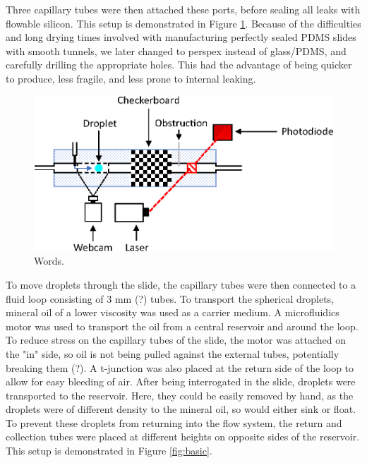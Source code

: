 \documentclass{physics_article_B}
\begin{document}
        Three capillary tubes were then attached these ports, before sealing all leaks with flowable silicon. This setup is demonstrated in Figure \ref{fig:control}. Because of the difficulties and long drying times involved with manufacturing perfectly sealed PDMS slides with smooth tunnels, we later changed to perspex instead of glass/PDMS, and carefully drilling the appropriate holes. This had the advantage of being quicker to produce, less fragile, and less prone to internal leaking. 
        
            \begin{figure}[H]
            \centering
            \hspace*{2cm}\includegraphics[scale=0.9]{Figures/Control.eps}
            \captionsetup{justification=centering}
            \caption{Words.} 	
            \label{fig:control}
            \end{figure} 
    
        To move droplets through the slide, the capillary tubes were then connected to a fluid loop consisting of 3 mm (?) tubes. To transport the spherical droplets, mineral oil of a lower viscosity was used as a carrier medium. A microfluidics motor was used to transport the oil from a central reservoir and around the loop. To reduce stress on the capillary tubes of the slide, the motor was attached on the "in" side, so oil is not being pulled against the external tubes, potentially breaking them (?). A t-junction was also placed at the return side of the loop to allow for easy bleeding of air. After being interrogated in the slide, droplets were transported to the reservoir. Here, they could be easily removed by hand, as the droplets were of different density to the mineral oil, so would either sink or float. To prevent these droplets from returning into the flow system, the return and collection tubes were placed at different heights on opposite sides of the reservoir. This setup is demonstrated in Figure \ref{fig:basic}.
        
\end{document}
